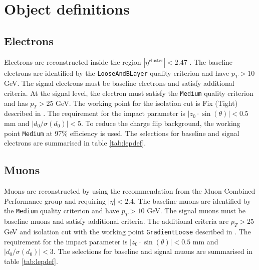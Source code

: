 \section{Object definitions}
\label{sec:object}

\subsection{Electrons}
Electrons are reconstructed inside the region $|\eta^{\text{cluster}}|<2.47$ \cite{electrons}.
The baseline electrons are identified by the \texttt{LooseAndBLayer} quality criterion and have $p_T>10$ GeV.
The signal electrons must be baseline electrons and satisfy additional criteria.
At the signal level, the electron must satisfy the \texttt{Medium} quality criterion and has $p_T>25$ GeV.
The working point for the isolation cut is Fix (Tight) described in \cite{electrons}.
The requirement for the impact parameter is $|z_0 \cdot \sin (\theta)|< 0.5$ mm and $|d_0/\sigma(d_0)|<5$.
To reduce the charge flip background, the working point \texttt{Medium} at 97\% efficiency is used.
The selections for baseline and signal electrons are summarised in table \ref{tab:lepdef}.

\subsection{Muons}
Muons are reconstructed by using the recommendation from the Muon Combined Performance group and requiring $|\eta|<2.4$. \cite{muons}
The baseline muons are identified by the \texttt{Medium} quality criterion and have $p_T>10$ GeV.
The signal muons must be baseline muons and satisfy additional criteria.
The additional criteria are $p_T>25$ GeV and isolation cut with the working point \texttt{GradientLoose} described in \cite{muons}.
The requirement for the impact parameter is $|z_0 \cdot \sin (\theta)|< 0.5$ mm and $|d_0/\sigma(d_0)|<3$.
The selections for baseline and signal muons are summarised in table \ref{tab:lepdef}.

